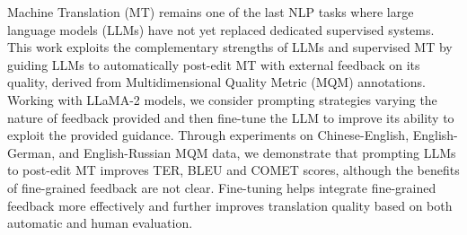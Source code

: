 Machine Translation (MT) remains one of the last NLP tasks where large language models (LLMs) have not yet replaced dedicated supervised systems. This work exploits the complementary strengths of LLMs and supervised MT by guiding LLMs to automatically post-edit MT with external feedback on its quality, derived from Multidimensional Quality Metric (MQM) annotations. Working with LLaMA-2 models, we consider prompting strategies varying the nature of feedback provided and then fine-tune the LLM to improve its ability to exploit the provided guidance. Through experiments on Chinese-English, English-German, and English-Russian MQM data, we demonstrate that prompting LLMs to post-edit MT improves TER, BLEU and COMET scores, although the benefits of fine-grained feedback are not clear. Fine-tuning helps integrate fine-grained feedback more effectively and further improves translation quality based on both automatic and human evaluation.